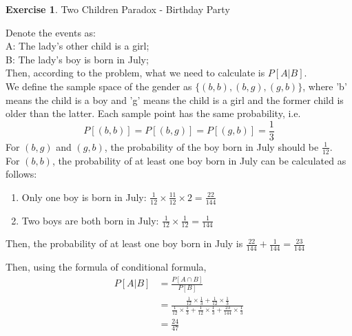 \documentclass[12pt,a4paper]{article}
\makeatletter
\theoremstyle{definition}
\newtheorem{exercise}{Exercise}
\newtheorem*{solution}{Solution}
\renewenvironment{solution}[1][Solution] {\par\pushQED{\qed}\normalfont\topsep6\p@\@plus6\p@\relax\trivlist\item[\hskip\labelsep\bfseries#1\@addpunct{.}]\ignorespaces}{\popQED\endtrivlist\@endpefalse} \makeatother
\makeatother
\begin{document}
\begin{exercise}
   Two Children Paradox - Birthday Party\\
   \begin{solution}
Denote the events as:\\
A: The lady's other child is a girl;\\
B: The lady's boy is born in July;\\
Then, according to the problem, what we need to calculate is $P[A|B]$.\\
We define the sample space of the gender as $\{(b,b),(b,g),(g,b)\}$, where 'b' means the child is a boy and 'g' means the child is a girl and the former child is older than the latter. Each sample point has the same probability, i.e. $$P[(b,b)]=P[(b,g)]=P[(g,b)]=\frac{1}{3}$$
For $(b,g)$ and $(g,b)$, the probability of the boy born in July should be $\frac{1}{12}$.\\
For $(b,b)$, the probability of at least one boy born in July can be calculated as follows:
\begin{enumerate}[label=\roman*)]
    \item Only one boy is born in July: $\frac{1}{12}\times\frac{11}{12}\times 2=\frac{22}{144}$
    \item Two boys are both born in July: $\frac{1}{12}\times\frac{1}{12}=\frac{1}{144}$
\end{enumerate}
Then, the probability of at least one boy born in July is $\frac{22}{144}+\frac{1}{144}=\frac{23}{144}$
   \end{solution}

Then, using the formula of conditional formula,
\begin{align*}
    P[A|B]&=\frac{P[A\cap B]}{P[B]}\\
    &=\frac{\frac{1}{12}\times \frac{1}{3}+\frac{1}{12}\times\frac{1}{3}}{\frac{1}{12}\times\frac{1}{3}+\frac{1}{12}\times\frac{1}{3}+\frac{23}{144}\times \frac{1}{3}}\\
    &=\frac{24}{47}
\end{align*}
\end{exercise}
\end{document}
